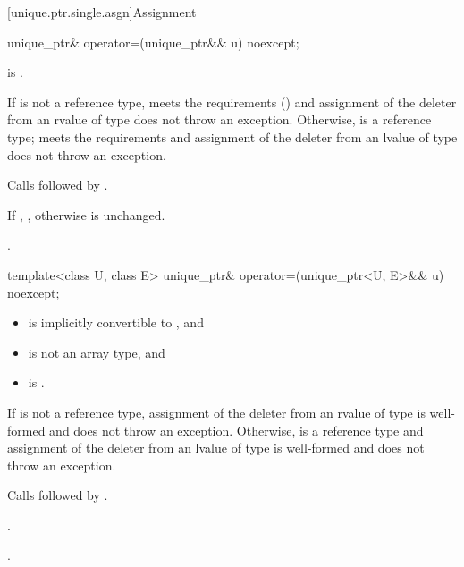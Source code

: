 [unique.ptr.single.asgn]{Assignment}

%
\begin{itemdecl}
unique_ptr& operator=(unique_ptr&& u) noexcept;
\end{itemdecl}

\begin{itemdescr}
\pnum
\constraints
{} is .

\pnum
\expects
If  is not a reference type,  meets the
 requirements () and assignment
of the deleter from an rvalue of type  does not throw an exception.
Otherwise,  is a reference type;
 meets the 
requirements and assignment of the deleter from an
lvalue of type  does not throw an exception.

\pnum
\effects
Calls  followed by
.

\pnum
\ensures
If ,
,
otherwise  is unchanged.

\pnum
\returns
{}.
\end{itemdescr}

%
\begin{itemdecl}
template<class U, class E> unique_ptr& operator=(unique_ptr<U, E>&& u) noexcept;
\end{itemdecl}

\begin{itemdescr}
\pnum
\constraints
\begin{itemize}
\item {} is implicitly convertible to , and
\item {} is not an array type, and
\item {} is .
\end{itemize}

\pnum
\expects
If  is not a reference type,
assignment of the deleter from an rvalue of type 
is well-formed and does not throw an exception.
Otherwise,  is a reference type and
assignment of the deleter from an lvalue of type 
is well-formed and does not throw an exception.

\pnum
\effects
Calls  followed by
.

\pnum
\ensures
{}.

\pnum
\returns
{}.
\end{itemdescr}

